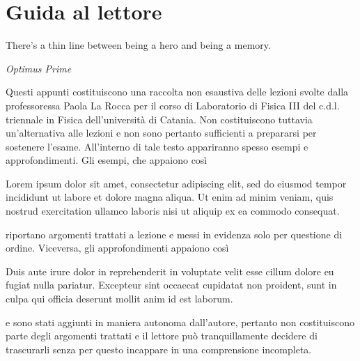 \documentclass[12pt,openany]{book}
\begin{document}
\newpage

\pagestyle{fancy}
\fancyhf{}
\fancyhead[LE]{\nouppercase{\textbf{\thepage}\hfill\leftmark}}
\fancyhead[RO]{\nouppercase{\rightmark\hfill \textbf{\thepage}}}

\chapter*{Guida al lettore}

\epigraph{There's a thin line between being a hero and being a memory.}{\textit{Optimus Prime}}

Questi appunti costituiscono una raccolta non esaustiva delle lezioni svolte dalla professoressa Paola La Rocca per il corso di Laboratorio di Fisica III del c.d.l. triennale in Fisica dell'università di Catania. Non costituiscono tuttavia un'alternativa alle lezioni e non sono pertanto sufficienti a prepararsi per sostenere l'esame. All'interno di tale testo appariranno spesso esempi e approfondimenti. Gli esempi, che appaiono così

\begin{esempio}
  Lorem ipsum dolor sit amet, consectetur adipiscing elit, sed do eiusmod tempor incididunt ut labore et dolore magna aliqua. Ut enim ad minim veniam, quis nostrud exercitation ullamco laboris nisi ut aliquip ex ea commodo consequat. 
\end{esempio}

riportano argomenti trattati a lezione e messi in evidenza solo per questione di ordine. Viceversa, gli approfondimenti appaiono così

\begin{approfondimento}
  \footnotesize
  Duis aute irure dolor in reprehenderit in voluptate velit esse cillum dolore eu fugiat nulla pariatur. Excepteur sint occaecat cupidatat non proident, sunt in culpa qui officia deserunt mollit anim id est laborum.
\end{approfondimento}

e sono stati aggiunti in maniera autonoma dall'autore, pertanto non costituiscono parte degli argomenti trattati e il lettore può tranquillamente decidere di trascurarli senza per questo incappare in una comprensione incompleta.

\thispagestyle{empty}
\end{document}
